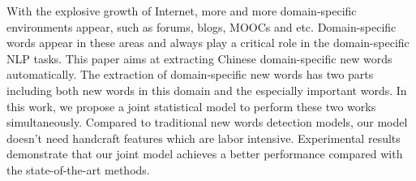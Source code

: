 With the explosive growth of Internet, more and more domain-specific environments appear, such as forums, blogs, MOOCs and etc. Domain-specific words appear in these areas and always play a critical role in the domain-specific NLP tasks. This paper aims at extracting Chinese domain-specific new words automatically. The extraction of domain-specific new words has two parts including both new words in this domain and the especially important words. In this work, we propose a joint statistical model to perform these two works simultaneously. Compared to traditional new words detection models, our model doesn't need handcraft features which are labor intensive. Experimental results demonstrate that our joint model achieves a better performance compared with the state-of-the-art methods.
